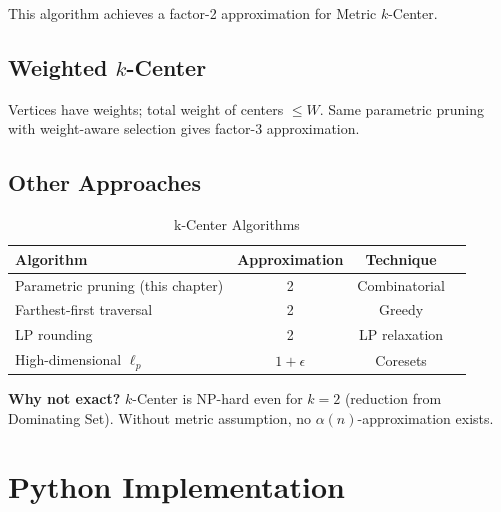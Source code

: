 \begin{theorem}
This algorithm achieves a factor-2 approximation for Metric $k$-Center.
\end{theorem}

\subsection{Weighted $k$-Center}

Vertices have weights; total weight of centers $\leq W$. Same parametric pruning with weight-aware selection gives factor-3 approximation.

\subsection{Other Approaches}

\begin{table}[H]
\centering
\caption{k-Center Algorithms}
\begin{tabular}{lccc}
\toprule
Algorithm & Approximation & Technique \\
\midrule
Parametric pruning (this chapter) & 2 & Combinatorial \\
Farthest-first traversal & 2 & Greedy \\
LP rounding & 2 & LP relaxation \\
High-dimensional $\ell_p$ & $1+\epsilon$ & Coresets \\
\bottomrule
\end{tabular}
\end{table}

\textbf{Why not exact?} $k$-Center is NP-hard even for $k=2$ (reduction from Dominating Set). Without metric assumption, no $\alpha(n)$-approximation exists.

\section{Python Implementation}

